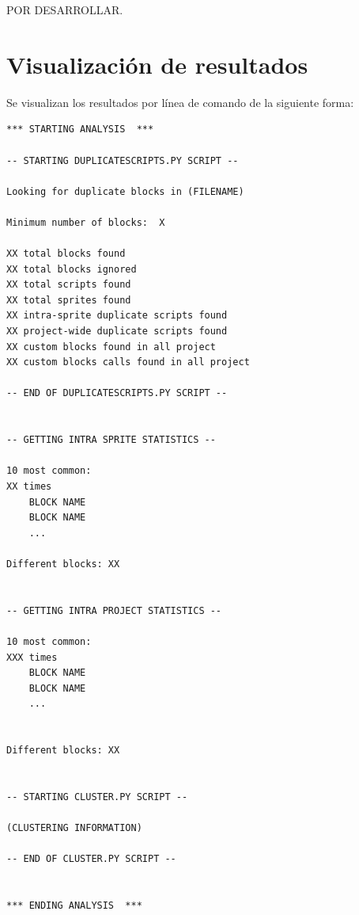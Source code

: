 \documentclass[a4paper, 12pt]{book}
\begin{document}
POR DESARROLLAR.

\section{Visualización de resultados} 
\label{sec:visualizacionresultados}

Se visualizan los resultados por línea de comando de la siguiente forma:

\begin{lstlisting}[style=consola,numbers=none]
*** STARTING ANALYSIS  ***

-- STARTING DUPLICATESCRIPTS.PY SCRIPT --

Looking for duplicate blocks in (FILENAME)

Minimum number of blocks:  X

XX total blocks found
XX total blocks ignored
XX total scripts found
XX total sprites found
XX intra-sprite duplicate scripts found
XX project-wide duplicate scripts found
XX custom blocks found in all project
XX custom blocks calls found in all project

-- END OF DUPLICATESCRIPTS.PY SCRIPT --


-- GETTING INTRA SPRITE STATISTICS --

10 most common:
XX times
	BLOCK NAME 
	BLOCK NAME
	...

Different blocks: XX


-- GETTING INTRA PROJECT STATISTICS --

10 most common:
XXX times
	BLOCK NAME
	BLOCK NAME
	...


Different blocks: XX


-- STARTING CLUSTER.PY SCRIPT --

(CLUSTERING INFORMATION)

-- END OF CLUSTER.PY SCRIPT --


*** ENDING ANALYSIS  ***


\end{lstlisting}

\end{document}

